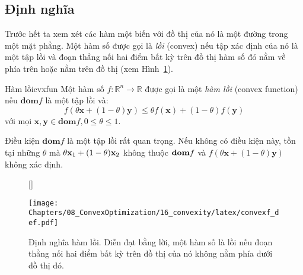 

\subsection{Định nghĩa}
Trước hết ta xem xét các hàm một biến với đồ thị của nó là một đường trong một
mặt phẳng. Một hàm số được gọi là \textit{lồi} (convex) nếu {tập xác định của nó
là một tập lồi} và đoạn thẳng nối hai điểm bất kỳ trên đồ thị hàm số đó nằm về phía trên hoặc nằm trên đồ thị (xem
Hình~\ref{fig:16_convexf_def}).
\begin{mydef}{Hàm lồi}{cvxfun}
Một hàm số $f: \mathbb{R}^n \rightarrow \mathbb{R} $ được gọi là một \textit{hàm lồi} (convex function) nếu $\textbf{dom} f$ là một {tập lồi} và:
\begin{equation*}
f(\theta\mathbf{x} + (1 - \theta) \mathbf{y}) \leq \theta f(\mathbf{x}) + (1 - \theta)f(\mathbf{y})
\end{equation*}
với mọi $\mathbf{x, y} \in \textbf{dom}f, 0 \leq \theta \leq 1$.
\end{mydef}


Điều kiện $\textbf{dom} f$ là một {tập lồi} rất quan trọng. Nếu không
có điều kiện này, tồn tại những $\theta$ mà $\theta \mathbf{x}_1 + (1-\theta)\mathbf{x}_2$
không thuộc $\boldsymbol{\mathbf{dom}} f$ và $f(\theta\mathbf{x} + (1 -
\theta)
\mathbf{y}) $ không xác định.


\begin{figure}[t]
[\FBwidth]
{\caption{Định nghĩa hàm lồi. Diễn đạt bằng lời, một hàm số là lồi nếu đoạn thẳng nối hai điểm bất kỳ trên đồ thị của nó {không nằm phía dưới} đồ thị đó. }
\label{fig:16_convexf_def}}
{\texttt{[image: Chapters/08\_ConvexOptimization/16\_convexity/latex/convexf\_def.pdf]}}
\end{figure}


